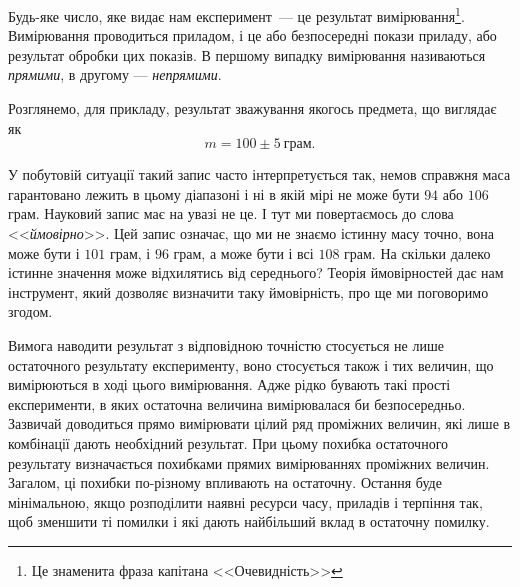 \documentclass{LabBook}
\begin{document}
Будь-яке число, яке видає нам експеримент~--- це результат вимірювання\footnote{Це знаменита фраза капітана <<Очевидність>>}. Вимірювання проводиться приладом, і це або безпосередні покази приладу, або результат обробки цих показів. В першому випадку вимірювання називаються \emph{прямими}, в другому --- \emph{непрямими}.


Розглянемо, для прикладу, результат зважування якогось предмета, що виглядає як
\begin{equation}\label{}
	m = 100 \pm 5~\text{грам}.
\end{equation}

У побутовій ситуації такий запис часто інтерпретується так, немов справжня маса гарантовано лежить в цьому діапазоні і ні в якій мірі не може бути $94$ або $106$ грам. Науковий запис має на увазі не це. І тут ми повертаємось до слова <<\emph{ймовірно}>>. Цей запис означає, що ми не знаємо істинну масу точно, вона може бути і $101$ грам, і $96$ грам, а може бути і всі $108$ грам. На скільки далеко істинне значення може відхилятись від середнього? Теорія ймовірностей дає нам інструмент, який дозволяє визначити таку ймовірність, про ще ми поговоримо згодом.

Вимога наводити результат з відповідною точністю стосується не лише остаточного результату експерименту, воно стосується  також і тих величин, що вимірюються в ході цього вимірювання. Адже рідко бувають такі прості експерименти, в яких остаточна величина вимірювалася би безпосередньо. Зазвичай доводиться прямо вимірювати цілий ряд проміжних величин, які лише в комбінації дають необхідний результат. При цьому похибка остаточного результату визначається похибками прямих вимірюваннях проміжних величин. Загалом, ці похибки по-різному впливають на остаточну. Остання буде мінімальною, якщо розподілити наявні ресурси часу, приладів і терпіння так, щоб зменшити ті помилки і які дають найбільший вклад в остаточну помилку.

\end{document}
